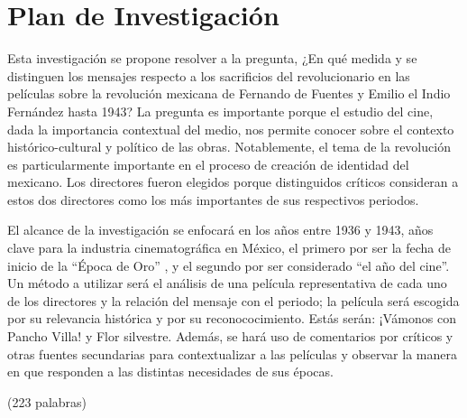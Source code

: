 \section{Plan de Investigación}
Esta investigación se propone resolver a la pregunta,
¿En qué medida y se distinguen los mensajes respecto a los sacrificios del revolucionario en las películas sobre la revolución
mexicana de Fernando de Fuentes y Emilio el Indio Fernández hasta 1943? 
La pregunta es importante porque el estudio del cine, dada la importancia
contextual del medio, nos permite conocer sobre el contexto histórico-cultural y
político de las obras.  %
Notablemente, el tema de la revolución es particularmente importante en el proceso de creación de identidad del mexicano. %
Los directores fueron elegidos porque distinguidos críticos consideran a estos dos directores como los más importantes de sus respectivos periodos. %

El alcance de la investigación se enfocará en los años entre 1936 y 1943, años
clave para la industria cinematográfica en México, el primero por ser la fecha de inicio de la ``Época de Oro'' %
, y el segundo por ser considerado ``el año del cine''. 
Un método a utilizar será el análisis de una película representativa de cada uno
de los directores y la relación del mensaje con el periodo; la película será
escogida por su relevancia histórica y por su reconococimiento.
Estás serán: ¡Vámonos con Pancho Villa! y Flor silvestre. %
Además, se hará uso de comentarios por críticos y otras fuentes secundarias para contextualizar a las películas y observar la manera en que responden a las distintas necesidades de sus épocas.

(223 palabras)
\pagebreak
